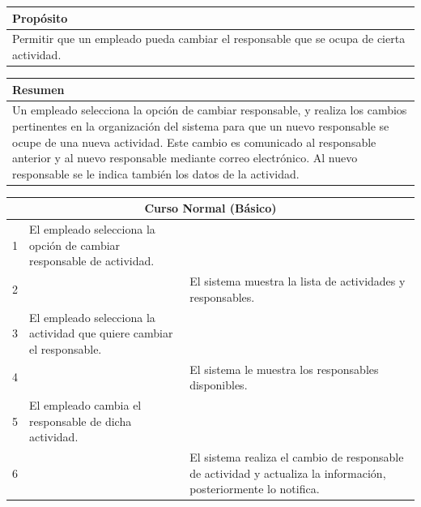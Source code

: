 \vspace{0.2cm}

\begin{table}[h!]
\centering
\begin{tabularx}{\textwidth}{|X|}
\hline
\cellcolor[HTML]{F2F2F2}\textbf{Propósito} \\ \hline
Permitir que un empleado pueda cambiar el responsable que se ocupa de cierta actividad. \\ \hline
\end{tabularx}
\end{table}

\vspace{0.2cm}

\begin{table}[h!]
\centering
\begin{tabularx}{\textwidth}{|X|}
\hline
\cellcolor[HTML]{F2F2F2}\textbf{Resumen} \\ \hline
Un empleado selecciona la opción de cambiar responsable, y realiza los cambios pertinentes en la organización del sistema para que un nuevo responsable se ocupe de una nueva actividad. Este cambio es comunicado al responsable anterior y al nuevo responsable mediante correo electrónico. Al nuevo responsable se le indica también los datos de la actividad. \\ \hline
\end{tabularx}
\end{table}

\vspace{0.2cm}

\begin{table}[h!]
\centering
\begin{tabularx}{\textwidth}{|c|X|X|}
\hline
\multicolumn{3}{|c|}{\cellcolor[HTML]{F2F2F2}\textbf{Curso Normal (Básico)}} \\ \hline
1 & El empleado selecciona la opción de cambiar responsable de actividad. & \\ \hline
2 & & El sistema muestra la lista de actividades y responsables. \\ \hline
3 & El empleado selecciona la actividad que quiere cambiar el responsable. & \\ \hline
4 & & El sistema le muestra los responsables disponibles. \\ \hline
5 & El empleado cambia el responsable de dicha actividad. & \\ \hline
6 & & El sistema realiza el cambio de responsable de actividad y actualiza la información, posteriormente lo notifica. \\ \hline
\end{tabularx}
\end{table}

